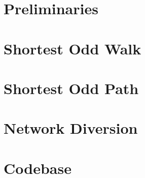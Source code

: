 \documentclass[12pt,oneside,final,a4paper]{report}
\theoremstyle{definition}
\begin{document}




\setcounter{page}{1}
\setlength{\parskip}{0.5cm plus4mm minus3mm}  



\chapter{Preliminaries}




\chapter{Shortest Odd Walk}
\label{chapter:odd-walk}




\chapter{Shortest Odd Path}
\label{chapter:odd-path}





\chapter{Network Diversion}
\label{chapter:network-diversion}





\chapter{Codebase}
\label{chapter:codebase}





\end{document}
